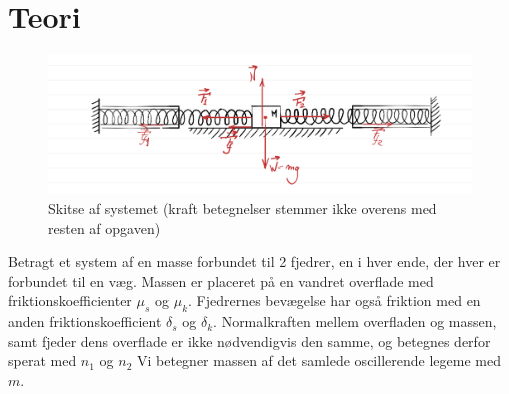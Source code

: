 \chapter{Teori}
%
\begin{figure}[htpb]
    \centering
    \includegraphics[width=0.8\linewidth,origin=c]{figures/systemskitse.png}
    \caption{Skitse af systemet (kraft betegnelser stemmer ikke overens med resten af opgaven)}
\end{figure}
%
Betragt et system af en masse forbundet til 2 fjedrer, en i hver ende, der hver er forbundet til en væg. 
Massen er placeret på en vandret overflade med friktionskoefficienter $\mu_s$ og $\mu_k$. 
Fjedrernes bevægelse har også friktion med en anden friktionskoefficient $\delta_s$ og $\delta_k$. 
Normalkraften mellem overfladen og massen, samt fjeder dens overflade er ikke nødvendigvis den samme, og betegnes derfor sperat med $n_1$ og $n_2$
Vi betegner massen af det samlede oscillerende legeme med $m$. 

